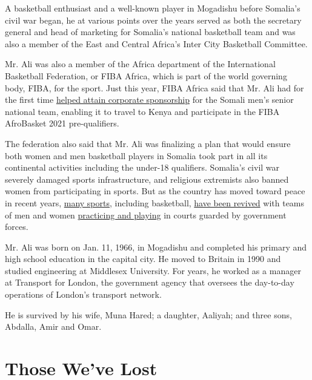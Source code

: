 A basketball enthusiast and a well-known player in Mogadishu before
Somalia's civil war began, he at various points over the years served as
both the secretary general and head of marketing for Somalia's national
basketball team and was also a member of the East and Central Africa's
Inter City Basketball Committee.

Mr. Ali was also a member of the Africa department of the International
Basketball Federation, or FIBA Africa, which is part of the world
governing body, FIBA, for the sport. Just this year, FIBA Africa said
that Mr. Ali had for the first time
\href{http://www.fiba.basketball/news/somalia-basketball-legend-bana-ali-succumbs-to-covid-19}{helped
attain corporate sponsorship} for the Somali men's senior national team,
enabling it to travel to Kenya and participate in the FIBA AfroBasket
2021 pre-qualifiers.

The federation also said that Mr. Ali was finalizing a plan that would
ensure both women and men basketball players in Somalia took part in all
its continental activities including the under-18 qualifiers. Somalia's
civil war severely damaged sports infrastructure, and religious
extremists also banned women from participating in sports. But as the
country has moved toward peace in recent years,
\href{https://www.nytimes.com/2020/03/18/world/africa/somalia-somaliland-running-women.html}{many
sports}, including basketball,
\href{https://www.newyorker.com/magazine/2017/09/11/the-fight-over-womens-basketball-in-somalia}{have
been revived} with teams of men and women
\href{https://www.youtube.com/watch?time_continue=10\&v=xLjCHjUQpvg\&feature=emb_logo}{practicing
and playing} in courts guarded by government forces.

Mr. Ali was born on Jan. 11, 1966, in Mogadishu and completed his
primary and high school education in the capital city. He moved to
Britain in 1990 and studied engineering at Middlesex University. For
years, he worked as a manager at Transport for London, the government
agency that oversees the day-to-day operations of London's transport
network.

He is survived by his wife, Muna Hared; a daughter, Aaliyah; and three
sons, Abdalla, Amir and Omar.

\href{https://www.nytimes.com/interactive/2020/obituaries/people-died-coronavirus-obituaries.html?action=click\&pgtype=Article\&state=default\&region=BELOW_MAIN_CONTENT\&context=covid_obits_promo}{}

\hypertarget{those-weve-lost}{%
\section{Those We've Lost}\label{those-weve-lost}}

